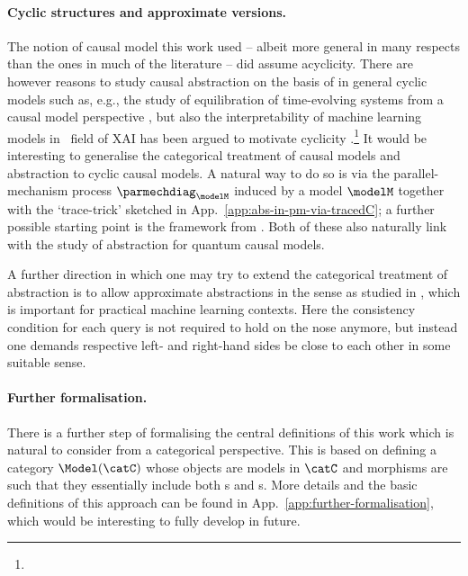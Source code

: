 \documentclass{article}
\begin{document}
{\paragraph{Cyclic structures and approximate versions.} 
The notion of causal model this work used -- albeit more general in many respects than the ones in much of the literature -- did assume acyclicity. 
There are however reasons to study causal abstraction on the basis of in general cyclic models such as, e.g., the study of equilibration of time-evolving systems from a causal model perspective \cite{rubenstein2017causal}, but also the interpretability of machine learning models in \ field of XAI has been argued to motivate cyclicity \cite{geiger2023causal}.\footnote{} 
It would be interesting to generalise the categorical treatment of causal models and abstraction to cyclic causal models. 
A natural way to do so is via the parallel-mechanism process $\parmechdiag_\modelM$ induced by a model $\modelM$ together with the `trace-trick' sketched in App.~\ref{app:abs-in-pm-via-tracedC}; a further possible starting point is the framework from \cite{ferradini2025cyclic}. Both of these also naturally link with the study of abstraction for quantum causal models. 

A further direction in which one may try to extend the categorical treatment of abstraction is to allow approximate abstractions in the sense as studied in \cite{beckers2020approximate, geiger2024finding, geiger2023causal}, which is important for practical machine learning contexts. Here the consistency condition for each query is not required to hold on the nose anymore, but instead one demands respective left- and right-hand sides be close to each other in some suitable sense.  


\paragraph{Further formalisation.}
There is a further step of formalising the central definitions of this work which is natural to consider from a categorical perspective. This is based on defining a category $\Model(\catC)$ whose objects are models in $\catC$ and morphisms are such that they essentially include both \qdown{}s and \qup{}s. More details and the basic definitions of this approach can be found in App.~\ref{app:further-formalisation}, which would be interesting to fully develop in future. 

}
\end{document}

